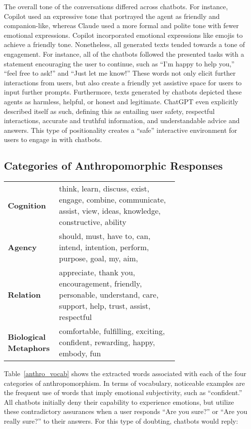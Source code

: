 The overall tone of the conversations differed across chatbots. For instance, Copilot used an expressive tone that portrayed the agent as friendly and companion-like, whereas Claude used a more formal and polite tone with fewer emotional expressions. Copilot incorporated emotional expressions like emojis to achieve a friendly tone. Nonetheless, all generated texts tended towards a tone of engagement. For instance, all of the chatbots followed the presented tasks with a statement encouraging the user to continue, such as ``I'm happy to help you,'' ``feel free to ask!'' and ``Just let me know!'' These words not only elicit further interactions from users, but also create a friendly yet assistive space for users to input further prompts. Furthermore, texts generated by chatbots depicted these agents as harmless, helpful, or honest and legitimate. ChatGPT even explicitly described itself as such, defining this as entailing user safety, respectful interactions, accurate and truthful information, and understandable advice and answers. This type of positionality creates a ``safe'' interactive environment for users to engage in with chatbots. 


\subsection{Categories of Anthropomorphic Responses}

\begin{table*}
  \begin{tabular}{l  p{0.7\linewidth}}
    \toprule
    
    \textbf{Cognition} & think, learn, discuss, exist, engage, combine, communicate, assist, view, ideas, knowledge, constructive, ability\\
    \textbf{Agency} & should, must, have to, can, intend, intention, perform, purpose, goal, my, aim, \\
    \textbf{Relation}& appreciate, thank you, encouragement, friendly, personable, understand, care, support, help, trust, assist, respectful\\
    \textbf{Biological Metaphors}& comfortable, fulfilling, exciting, confident, rewarding, happy, embody, fun\\
    \bottomrule
  \end{tabular}
  \caption{The list of extracted words by category.}
  \label{anthro_vocab}
\end{table*}

Table~\ref{anthro_vocab} shows the extracted words associated with each of the four categories of anthropomorphism. In terms of vocabulary, noticeable examples are the frequent use of words that imply emotional subjectivity, such as ``confident.'' All chatbots initially deny their capability to experience emotions, but utilize these contradictory assurances when a user responds ``Are you sure?'' or ``Are you really sure?'' to their answers. For this type of doubting, chatbots would reply:

